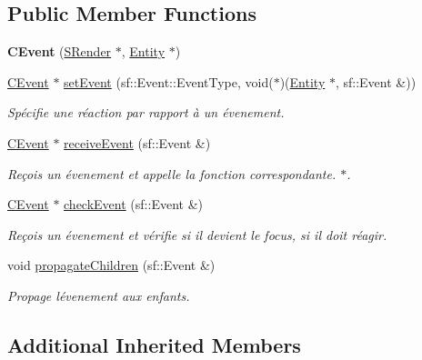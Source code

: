 \subsection*{Public Member Functions}
\begin{DoxyCompactItemize}
\item 
\hypertarget{class_c_event_a85be8a946bcaf5b2bae52126d9804d16}{}{\bfseries C\+Event} (\hyperlink{class_s_render}{S\+Render} $\ast$, \hyperlink{class_entity}{Entity} $\ast$)\label{class_c_event_a85be8a946bcaf5b2bae52126d9804d16}

\item 
\hyperlink{class_c_event}{C\+Event} $\ast$ \hyperlink{class_c_event_ad43296e11915e550761216b4866f2b75}{set\+Event} (sf\+::\+Event\+::\+Event\+Type, void($\ast$)(\hyperlink{class_entity}{Entity} $\ast$, sf\+::\+Event \&))
\begin{DoxyCompactList}\small\item\em Spécifie une réaction par rapport à un évenement. \end{DoxyCompactList}\item 
\hyperlink{class_c_event}{C\+Event} $\ast$ \hyperlink{class_c_event_a51534e6480051b3b2c38f618c27495cb}{receive\+Event} (sf\+::\+Event \&)
\begin{DoxyCompactList}\small\item\em Reçois un évenement et appelle la fonction correspondante. $\ast$. \end{DoxyCompactList}\item 
\hyperlink{class_c_event}{C\+Event} $\ast$ \hyperlink{class_c_event_a027b94f30ebdf2f699613aa56570ea86}{check\+Event} (sf\+::\+Event \&)
\begin{DoxyCompactList}\small\item\em Reçois un évenement et vérifie si il devient le focus, si il doit réagir. \end{DoxyCompactList}\item 
\hypertarget{class_c_event_ae9c23f7c6cc4db8502790ff10c6a0c32}{}void \hyperlink{class_c_event_ae9c23f7c6cc4db8502790ff10c6a0c32}{propagate\+Children} (sf\+::\+Event \&)\label{class_c_event_ae9c23f7c6cc4db8502790ff10c6a0c32}

\begin{DoxyCompactList}\small\item\em Propage l\textquotesingle{}évenement aux enfants. \end{DoxyCompactList}\end{DoxyCompactItemize}
\subsection*{Additional Inherited Members}


